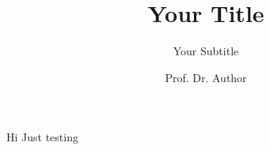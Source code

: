 \documentclass{beamer}
\author{Prof. Dr. Author}
\title{Your Title}
\subtitle{Your Subtitle}
\begin{document}
\maketitle

\begin{frame}{Hi}
Just testing
\end{frame}
\end{document}

